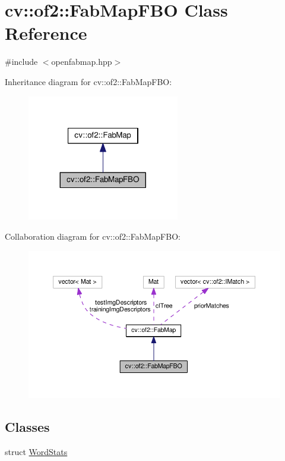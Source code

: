 \hypertarget{classcv_1_1of2_1_1FabMapFBO}{\section{cv\-:\-:of2\-:\-:Fab\-Map\-F\-B\-O Class Reference}
\label{classcv_1_1of2_1_1FabMapFBO}
}


{\ttfamily \#include $<$openfabmap.\-hpp$>$}



Inheritance diagram for cv\-:\-:of2\-:\-:Fab\-Map\-F\-B\-O\-:\nopagebreak
\begin{figure}[H]
\begin{center}
\leavevmode
\includegraphics[width=188pt]{classcv_1_1of2_1_1FabMapFBO__inherit__graph}
\end{center}
\end{figure}


Collaboration diagram for cv\-:\-:of2\-:\-:Fab\-Map\-F\-B\-O\-:\nopagebreak
\begin{figure}[H]
\begin{center}
\leavevmode
\includegraphics[width=350pt]{classcv_1_1of2_1_1FabMapFBO__coll__graph}
\end{center}
\end{figure}
\subsection*{Classes}
\begin{DoxyCompactItemize}
\item 
struct \hyperlink{structcv_1_1of2_1_1FabMapFBO_1_1WordStats}{Word\-Stats}
\end{DoxyCompactItemize}
